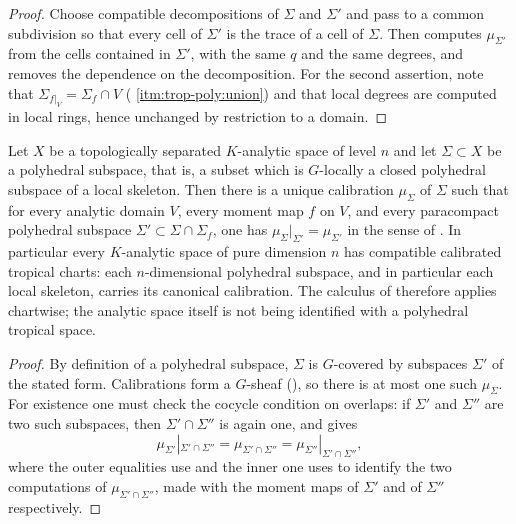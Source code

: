 \begin{proof}
Choose compatible decompositions of $\Sigma$ and $\Sigma'$ and pass to a
common subdivision so that every cell of $\Sigma'$ is the trace of a cell of
$\Sigma$. Then
 computes $\mu_{\Sigma'}$ from the
cells contained in $\Sigma'$, with the same $q$ and the same degrees, and
 removes the dependence on the
decomposition. For the second assertion, note that
$\Sigma_{f|_V}=\Sigma_f\cap V$ (
\cref{itm:trop-poly:union}) and that local degrees are computed in local
rings, hence unchanged by restriction to a domain.
\end{proof}

\begin{corollary}
\label{cor:trop-calibration-glue}
Let $X$ be a topologically separated $K$-analytic space of level $n$ and let
$\Sigma\subset X$ be a polyhedral subspace, that is, a subset which is
$G$-locally a closed polyhedral subspace of a local skeleton. Then there is a
unique calibration $\mu_\Sigma$ of $\Sigma$ such that for every analytic
domain $V$, every moment map $f$ on $V$, and every paracompact polyhedral
subspace $\Sigma'\subset\Sigma\cap\Sigma_f$, one has
$\mu_\Sigma|_{\Sigma'}=\mu_{\Sigma'}$ in the sense of
. In particular every $K$-analytic
space of pure dimension $n$ has compatible calibrated tropical charts: each
$n$-dimensional polyhedral subspace, and in particular each local skeleton,
carries its canonical calibration. The calculus of
 therefore applies
chartwise; the analytic space itself is not being identified with a
polyhedral tropical space.
\end{corollary}

\begin{proof}
By definition of a polyhedral subspace, $\Sigma$ is $G$-covered by
subspaces $\Sigma'$ of the stated form. Calibrations form a $G$-sheaf
(), so there is at most one such $\mu_\Sigma$.
For existence one must check the cocycle condition on overlaps: if
$\Sigma'$ and $\Sigma''$ are two such subspaces, then
$\Sigma'\cap\Sigma''$ is again one, and
 gives
\[
 \mu_{\Sigma'}|_{\Sigma'\cap\Sigma''}
 =\mu_{\Sigma'\cap\Sigma''}
 =\mu_{\Sigma''}|_{\Sigma'\cap\Sigma''},
\]
where the outer equalities use  and
the inner one uses  to identify
the two computations of $\mu_{\Sigma'\cap\Sigma''}$, made with the moment
maps of $\Sigma'$ and of $\Sigma''$ respectively.
\end{proof}

